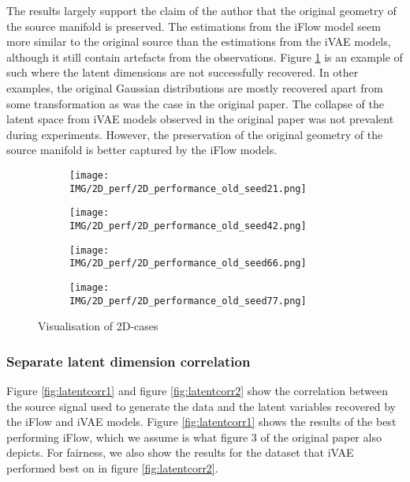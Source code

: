 The results largely support the claim of the author that the original geometry of the source manifold is preserved. The estimations from the iFlow model seem more similar to the original source than the estimations from the iVAE models, although it still contain artefacts from the observations. Figure \ref{fig:2D:a} is an example of such where the latent dimensions are not successfully recovered. In other examples, the original Gaussian distributions are mostly recovered apart from some transformation as was the case in the original paper. The collapse of the latent space from iVAE models observed in the original paper was not prevalent during experiments. However, the preservation of the original geometry of the source manifold is better captured by the iFlow models.

\begin{figure}[ht] 
    \centering
  \begin{subfigure}[b]{0.4\linewidth}
    \centering
    \texttt{[image: IMG/2D\_perf/2D\_performance\_old\_seed21.png]} 
    \caption{} 
    \label{fig:2D:a} 
  \end{subfigure}%
  \begin{subfigure}[b]{0.4\linewidth}
    \centering
    \texttt{[image: IMG/2D\_perf/2D\_performance\_old\_seed42.png]} 
    \caption{} 
    \label{fig:2D:b} 
  \end{subfigure} 
  \begin{subfigure}[b]{0.4\linewidth}
    \centering
    \texttt{[image: IMG/2D\_perf/2D\_performance\_old\_seed66.png]} 
    \caption{} 
    \label{fig:2D:c} 
  \end{subfigure}%
  \begin{subfigure}[b]{0.4\linewidth}
    \centering
    \texttt{[image: IMG/2D\_perf/2D\_performance\_old\_seed77.png]} 
    \caption{} 
    \label{fig:2D:d} 
  \end{subfigure} 
  \caption{Visualisation of 2D-cases}
  \label{fig:2D} 
\end{figure}

\subsubsection{Separate latent dimension correlation}
\label{sec:latentcorr}
Figure \ref{fig:latentcorr1} and figure \ref{fig:latentcorr2} show the correlation between the source signal used to generate the data and the latent variables recovered by the iFlow and iVAE models. Figure \ref{fig:latentcorr1} shows the results of the best performing iFlow, which we assume is what figure 3 of the original paper also depicts. For fairness, we also show the results for the dataset that iVAE performed best on in figure \ref{fig:latentcorr2}.

